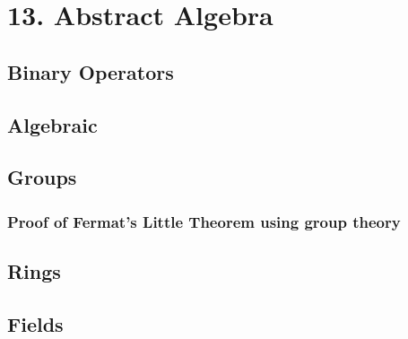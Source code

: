 \documentclass[11pt]{article}
\theoremstyle{plain}
\theoremstyle{definition}
\begin{document}
\section*{13. Abstract Algebra}

\subsection*{Binary Operators}

\subsection*{Algebraic}

\subsection*{Groups}

\subsubsection*{Proof of Fermat's Little Theorem using group theory}

\subsection*{Rings}

\subsection*{Fields}
\end{document}
